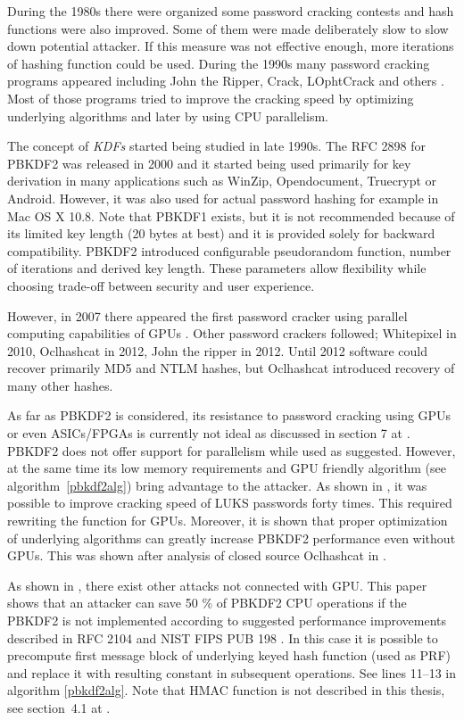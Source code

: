 \documentclass[nolof]{fithesis3}
\begin{document}
During the 1980s there were organized some password cracking contests and hash functions were also improved. Some of them were made deliberately slow to slow down potential attacker. If this measure was not effective enough, more iterations of hashing function could be used. During the 1990s many password cracking programs appeared including John the Ripper, Crack, LOphtCrack and others \parencite{crackinghistory}. Most of those programs tried to improve the cracking speed by optimizing underlying algorithms and later by using CPU parallelism.

The concept of \emph{KDFs} started being studied in late 1990s. The RFC 2898 for PBKDF2 was released in 2000 and it started being used primarily for key derivation in many applications such as WinZip, Opendocument, Truecrypt or Android. However, it was also used for actual password hashing for example in Mac OS X 10.8. Note that PBKDF1 exists, but it is not recommended because of its limited key length (20 bytes at best) and it is provided solely for backward compatibility. PBKDF2 introduced configurable pseudorandom function, number of iterations and derived key length. These parameters allow flexibility while choosing trade-off between security and user experience.

However, in 2007 there appeared the first password cracker using parallel computing capabilities of GPUs \parencite{elcomsoftgpu}. Other password crackers followed; Whitepixel in 2010, Oclhashcat in 2012, John the ripper in 2012. Until 2012 software could recover primarily MD5 and NTLM hashes, but Oclhashcat introduced recovery of many other hashes.

As far as PBKDF2 is considered, its resistance to password cracking using GPUs or even ASICs/FPGAs is currently not ideal as discussed in section 7 at \parencite{mosnacek}. PBKDF2 does not offer support for parallelism while used as suggested. However, at the same time its low memory requirements and GPU friendly algorithm (see algorithm~\ref{pbkdf2alg}) bring advantage to the attacker. As shown in \parencite{mosnacek}, it was possible to improve cracking speed of LUKS passwords forty times. This required rewriting the function for GPUs. Moreover, it is shown that proper optimization of underlying algorithms can greatly increase PBKDF2 performance even without GPUs. This was shown after analysis of closed source Oclhashcat in \parencite{pbkdf2accel}.

As shown in \parencite{pbkdf2weakness}, there exist other attacks not connected with GPU. This paper shows that an attacker can save 50 \% of PBKDF2 CPU operations if the PBKDF2 is not implemented according to suggested performance improvements described in RFC 2104 \parencite{rfc2104} and NIST FIPS PUB 198 \parencite{fipspub198}. In this case it is possible to precompute first message block of underlying keyed hash function (used as PRF) and replace it with resulting constant in subsequent operations. See lines 11--13 in algorithm \ref{pbkdf2alg}. Note that HMAC function is not described in this thesis, see section~4.1 at \parencite{pbkdf2weakness}. 
\end{document}
